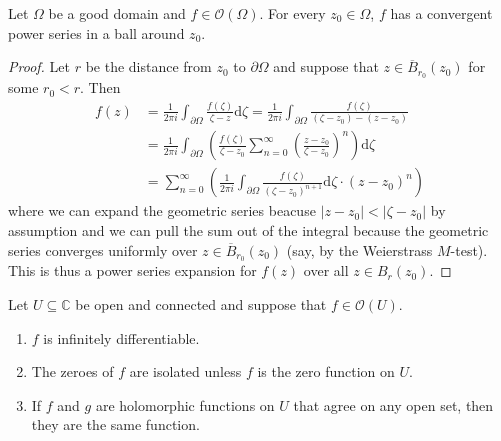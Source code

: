 \documentclass[10pt]{article}
\providecommand{\ol}{\overline}
\providecommand{\dd}{\mathrm d}
\providecommand{\CC}{\mathbb C}
\providecommand{\ii}{\item}
\providecommand{\abs}[1]{\left\lvert{#1}\right\rvert}
\begin{document}
\pagebreak
\begin{theorem}
    \label{thm:holomorphic-implies-analytic}
    Let $\Omega$ be a good domain and $f\in\mathcal O(\Omega)$.
    For every $z_0\in\Omega$, $f$ has a convergent power series
    in a ball around $z_0$.
\end{theorem}

\begin{proof}
    Let $r$ be the distance from $z_0$ to $\partial\Omega$
    and suppose that $z\in\ol B_{r_0}(z_0)$ for some $r_0 < r$.
    Then
    \begin{align*}
	f(z)
	&= \frac{1}{2\pi i}\int_{\partial\Omega}
	\frac{f(\zeta)}{\zeta-z}\dd\zeta
	= \frac 1{2\pi i}\int_{\partial\Omega}
	\frac{f(\zeta)}{(\zeta - z_0) - (z-z_0)}\\
	&= \frac 1{2\pi i}\int_{\partial\Omega}
	\left(\frac{f(\zeta)}{\zeta - z_0}\sum_{n=0}^\infty
	\left(\frac{z-z_0}{\zeta-z_0}\right)^n\right)\dd\zeta\\
	&= \sum_{n=0}^\infty \left( \frac 1{2\pi i}
	\int_{\partial\Omega}\frac{f(\zeta)}{(\zeta-z_0)^{n+1}}\dd\zeta
        \cdot (z-z_0)^n\right)
    \end{align*}
    where we can expand the geometric series beacuse
    $\abs{z-z_0} < \abs{\zeta - z_0}$ by assumption
    and we can pull the sum out of the integral because
    the geometric series converges uniformly
    over $z\in\ol B_{r_0}(z_0)$ (say, by the Weierstrass $M$-test).
    This is thus a power series expansion for $f(z)$
    over all $z\in B_r(z_0)$.
\end{proof}

\begin{prop}
    \label{prop:analytic-continuation}
    Let $U\subseteq\CC$ be open and connected
    and suppose that $f\in\mathcal O(U)$.
    \begin{enumerate}[(1)]
        \ii $f$ is infinitely differentiable.
	\ii The zeroes of $f$ are isolated unless $f$ is
	the zero function on $U$.
	\ii If $f$ and $g$ are holomorphic functions on $U$
	that agree on any open set, then they are the same function.
    \end{enumerate}
\end{prop}
\end{document}
